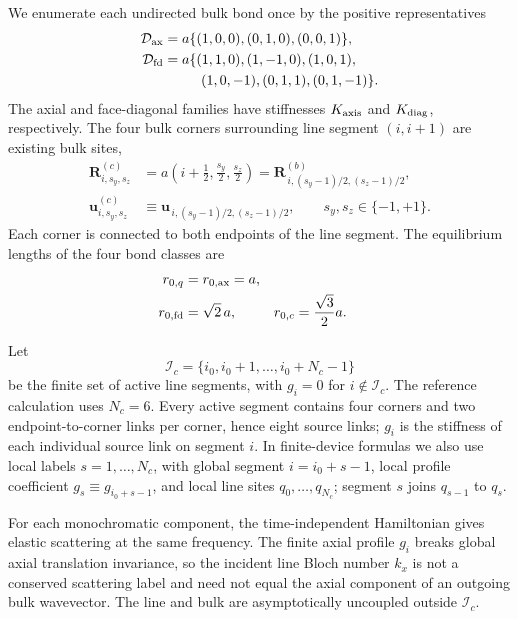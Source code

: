 \documentclass[10pt,aps,pre,reprint,floatfix,notitlepage,nofootinbib]{revtex4-2}
\newcommand{\vu}{\bm{u}}
\newcommand{\vR}{\bm{R}}
\newcommand{\Ic}{\mathcal I_c}
\begin{document}
We enumerate each undirected bulk bond once by the positive representatives
\begin{align}
  \mathcal D_{\rm ax}
  &=a\{(1,0,0),(0,1,0),(0,0,1)\},
  \label{eq:s2-Dax}\\
  \mathcal D_{\rm fd}
  &=a\{(1,1,0),(1,-1,0),(1,0,1),\\
  &\hspace{2.7em}(1,0,-1),(0,1,1),(0,1,-1)\}.
  \label{eq:s2-Dfd}
\end{align}
The axial and face-diagonal families have stiffnesses $K_{\rm axis}$ and $K_{\rm diag}$, respectively. The four bulk corners surrounding line segment $(i,i+1)$ are existing bulk sites,
\begin{align}
  \vR_{i,s_y,s_z}^{(c)}
  &=a\left(i+\tfrac12,\tfrac{s_y}{2},\tfrac{s_z}{2}\right)
   =\vR_{\,i,(s_y-1)/2,(s_z-1)/2}^{(b)},
  \label{eq:s2-corner-position}\\
  \vu_{i,s_y,s_z}^{(c)}
  &\equiv
  \vu_{\,i,(s_y-1)/2,(s_z-1)/2},
  \qquad s_y,s_z\in\{-1,+1\}.
  \label{eq:s2-corner-displacement}
\end{align}
Each corner is connected to both endpoints of the line segment. The equilibrium lengths of the four bond classes are
\begin{equation}
\begin{aligned}
  r_{0,q}&=r_{0,\rm ax}=a,\\
  r_{0,\rm fd}&=\sqrt2\,a,
  &r_{0,c}&=\frac{\sqrt3}{2}a.
\end{aligned}
\label{eq:s2-rest-lengths}
\end{equation}

Let
\begin{equation}
  \Ic=\{i_0,i_0+1,\ldots,i_0+N_c-1\}
  \label{eq:s2-active-set}
\end{equation}
be the finite set of active line segments, with $g_i=0$ for $i\notin\Ic$. The reference calculation uses $N_c=6$. Every active segment contains four corners and two endpoint-to-corner links per corner, hence eight source links; $g_i$ is the stiffness of each individual source link on segment $i$.  In finite-device formulas we also use local labels $s=1,\ldots,N_c$, with global segment $i=i_0+s-1$, local profile coefficient $g_s\equiv g_{i_0+s-1}$, and local line sites $q_0,\ldots,q_{N_c}$; segment $s$ joins $q_{s-1}$ to $q_s$.

For each monochromatic component, the time-independent Hamiltonian gives elastic scattering at the same frequency. The finite axial profile $g_i$ breaks global axial translation invariance, so the incident line Bloch number $k_x$ is not a conserved scattering label and need not equal the axial component of an outgoing bulk wavevector. The line and bulk are asymptotically uncoupled outside $\Ic$.
\end{document}
